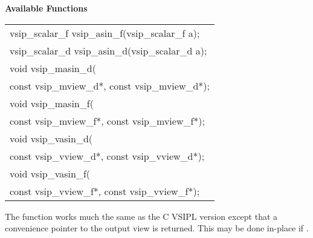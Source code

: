 \cvsiplh
\newline \hspace*{.8cm} \vspace*{.1cm} \textbf{Available Functions }
\newline \hspace*{1.1cm} {
\ttfamily
\begin{tabular}[H]{l}
vsip\_scalar\_f vsip\_asin\_f(vsip\_scalar\_f a);\\
vsip\_scalar\_d vsip\_asin\_d(vsip\_scalar\_d a);\\
void vsip\_masin\_d(\\*
\hspace{1cm}const vsip\_mview\_d*, const vsip\_mview\_d*);\\
void vsip\_masin\_f(\\*
\hspace{1cm}const vsip\_mview\_f*, const vsip\_mview\_f*);\\
void vsip\_vasin\_d(\\*
\hspace{1cm}const vsip\_vview\_d*, const vsip\_vview\_d*);\\
void vsip\_vasin\_f(\\*
\hspace{1cm}const vsip\_vview\_f*, const vsip\_vview\_f*);\\
\end{tabular}
}
\pyjvsiph
{}
\newline\hspace*{1.2cm}\parbox{10.8cm}{\vspace*{.1cm}The  function works much the same as the C VSIPL version except that a convenience pointer to the output view is returned. This may be done in-place if .}
